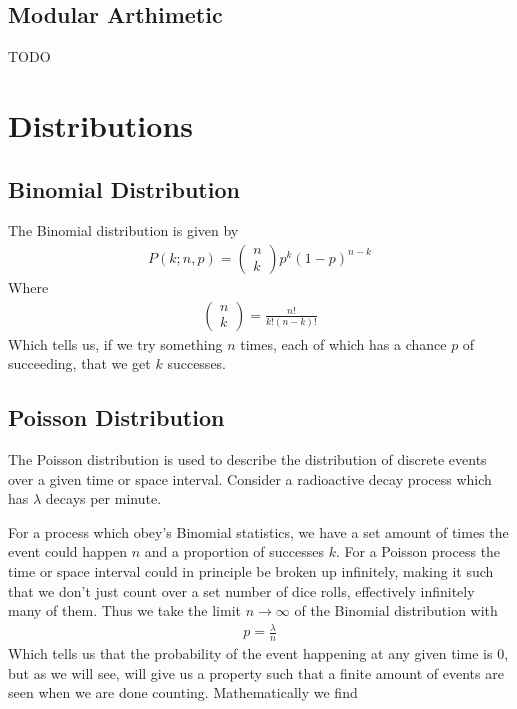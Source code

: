\subsection{Modular Arthimetic}
TODO

\section{Distributions}
\subsection{Binomial Distribution}
The Binomial distribution is given by
\begin{align}
P(k;n,p) = \begin{pmatrix}
n\\
k
\end{pmatrix}p^k(1-p)^{n-k}
\end{align}
Where 
\begin{align}
\begin{pmatrix}
n\\
k
\end{pmatrix} = \frac{n!}{k!(n-k)!}
\end{align}
Which tells us, if we try something $n$ times, each of which has a chance $p$ of succeeding, that we get $k$ successes. 

\subsection{Poisson Distribution}
The Poisson distribution is used to describe the distribution of discrete events over a given time or space interval. Consider a radioactive decay process which has $\lambda$ decays per minute. 

For a process which obey's Binomial statistics, we have a set amount of times the event could happen $n$ and a proportion of successes $k$. For a Poisson process the time or space interval could in principle be broken up infinitely, making it such that we don't just count over a set number of dice rolls, effectively infinitely many of them. Thus we take the limit $n\rightarrow \infty$ of the Binomial distribution with
\begin{align}
p = \frac{\lambda}{n}
\end{align}
Which tells us that the probability of the event happening at any given time is $0$, but as we will see, will give us a property such that a finite amount of events are seen when we are done counting. Mathematically we find

